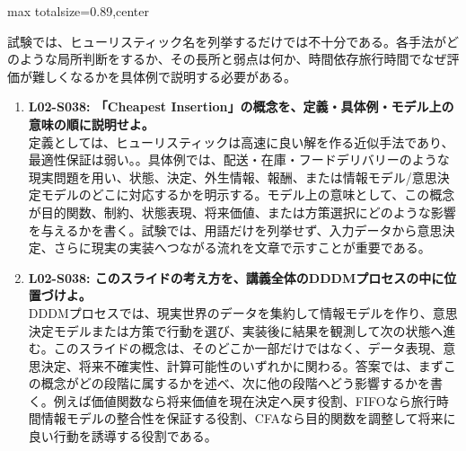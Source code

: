 \begin{minipage}[t]{0.58\textwidth}
\begin{adjustbox}{max totalsize={\textwidth}{0.89\textheight},center}
\begin{minipage}{\textwidth}
試験では、ヒューリスティック名を列挙するだけでは不十分である。各手法がどのような局所判断をするか、その長所と弱点は何か、時間依存旅行時間でなぜ評価が難しくなるかを具体例で説明する必要がある。\par{}\begin{enumerate}\item \textbf{L02-S038: 「Cheapest Insertion」の概念を、定義・具体例・モデル上の意味の順に説明せよ。}\\定義としては、ヒューリスティックは高速に良い解を作る近似手法であり、最適性保証は弱い。。具体例では、配送・在庫・フードデリバリーのような現実問題を用い、状態、決定、外生情報、報酬、または情報モデル/意思決定モデルのどこに対応するかを明示する。モデル上の意味として、この概念が目的関数、制約、状態表現、将来価値、または方策選択にどのような影響を与えるかを書く。試験では、用語だけを列挙せず、入力データから意思決定、さらに現実の実装へつながる流れを文章で示すことが重要である。\item \textbf{L02-S038: このスライドの考え方を、講義全体のDDDMプロセスの中に位置づけよ。}\\DDDMプロセスでは、現実世界のデータを集約して情報モデルを作り、意思決定モデルまたは方策で行動を選び、実装後に結果を観測して次の状態へ進む。このスライドの概念は、そのどこか一部だけではなく、データ表現、意思決定、将来不確実性、計算可能性のいずれかに関わる。答案では、まずこの概念がどの段階に属するかを述べ、次に他の段階へどう影響するかを書く。例えば価値関数なら将来価値を現在決定へ戻す役割、FIFOなら旅行時間情報モデルの整合性を保証する役割、CFAなら目的関数を調整して将来に良い行動を誘導する役割である。\end{enumerate}
\end{minipage}
\end{adjustbox}
\end{minipage}


